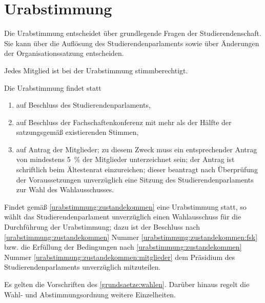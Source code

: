 %
%

\parnumberfalse \section{Urabstimmung}\label{urabstimmung} \parnumbertrue

\parnumberfalse Die Urabstimmung entscheidet über grundlegende Fragen der Studierendenschaft. Sie kann über die Auflösung des Studierendenparlaments sowie über Änderungen der Organisationssatzung entscheiden.\parnumbertrue

\parnumberfalse Jedes Mitglied ist bei der Urabstimmung stimmberechtigt.\parnumbertrue

\label{urabstimmung:zustandekommen}
\parnumberfalse Die Urabstimmung findet statt
\begin{enumerate}
\item auf Beschluss des Studierendenparlaments,
\item auf Beschluss der Fachschaftenkonferenz mit mehr als der Hälfte der satzungsgemäß existierenden Stimmen, \label{urabstimmung:zustandekommen:fsk}
\item auf Antrag der Mitglieder; zu diesem Zweck muss ein entsprechender Antrag von mindestens 5~\% der Mitglieder unterzeichnet sein; der Antrag ist schriftlich beim Ältestenrat einzureichen; dieser beantragt nach Überprüfung der Voraussetzungen unverzüglich eine Sitzung des Studierendenparlaments zur Wahl des Wahlausschusses. \label{urabstimmung:zustandekommen:mitglieder}
\end{enumerate} \parnumbertrue

\label{urabstimmung:orga}

Findet gemäß \ref{urabstimmung:zustandekommen} eine Urabstimmung statt, so wählt das Studierendenparlament unverzüglich einen Wahlausschuss für die Durchführung der Urabstimmung; dazu ist der Beschluss nach \ref{urabstimmung:zustandekommen} Nummer \ref{urabstimmung:zustandekommen:fsk} bzw. die Erfüllung  der Bedingungen nach \ref{urabstimmung:zustandekommen}  Nummer \ref{urabstimmung:zustandekommen:mitglieder} dem Präsidium des Studierendenparlaments unverzüglich mitzuteilen.

Es gelten die Vorschriften des \ref{grundsaetze:wahlen}. Darüber hinaus regelt die Wahl- und Abstimmungsordnung weitere Einzelheiten.



